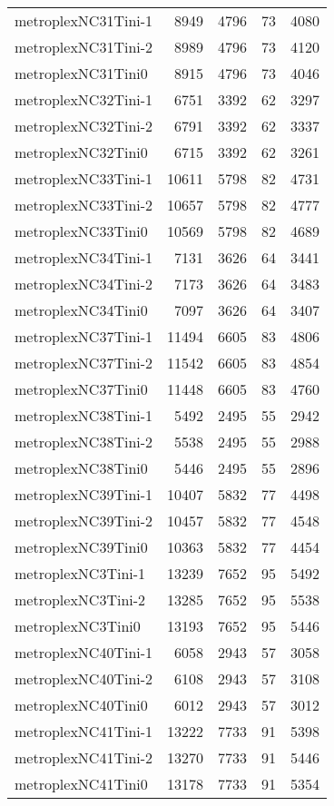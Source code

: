 \begin{longtable}{lrrrr}
metroplexNC31Tini-1 & 8949 & 4796 & 73 & 4080 \\
metroplexNC31Tini-2 & 8989 & 4796 & 73 & 4120 \\
metroplexNC31Tini0 & 8915 & 4796 & 73 & 4046 \\
metroplexNC32Tini-1 & 6751 & 3392 & 62 & 3297 \\
metroplexNC32Tini-2 & 6791 & 3392 & 62 & 3337 \\
metroplexNC32Tini0 & 6715 & 3392 & 62 & 3261 \\
metroplexNC33Tini-1 & 10611 & 5798 & 82 & 4731 \\
metroplexNC33Tini-2 & 10657 & 5798 & 82 & 4777 \\
metroplexNC33Tini0 & 10569 & 5798 & 82 & 4689 \\
metroplexNC34Tini-1 & 7131 & 3626 & 64 & 3441 \\
metroplexNC34Tini-2 & 7173 & 3626 & 64 & 3483 \\
metroplexNC34Tini0 & 7097 & 3626 & 64 & 3407 \\
metroplexNC37Tini-1 & 11494 & 6605 & 83 & 4806 \\
metroplexNC37Tini-2 & 11542 & 6605 & 83 & 4854 \\
metroplexNC37Tini0 & 11448 & 6605 & 83 & 4760 \\
metroplexNC38Tini-1 & 5492 & 2495 & 55 & 2942 \\
metroplexNC38Tini-2 & 5538 & 2495 & 55 & 2988 \\
metroplexNC38Tini0 & 5446 & 2495 & 55 & 2896 \\
metroplexNC39Tini-1 & 10407 & 5832 & 77 & 4498 \\
metroplexNC39Tini-2 & 10457 & 5832 & 77 & 4548 \\
metroplexNC39Tini0 & 10363 & 5832 & 77 & 4454 \\
metroplexNC3Tini-1 & 13239 & 7652 & 95 & 5492 \\
metroplexNC3Tini-2 & 13285 & 7652 & 95 & 5538 \\
metroplexNC3Tini0 & 13193 & 7652 & 95 & 5446 \\
metroplexNC40Tini-1 & 6058 & 2943 & 57 & 3058 \\
metroplexNC40Tini-2 & 6108 & 2943 & 57 & 3108 \\
metroplexNC40Tini0 & 6012 & 2943 & 57 & 3012 \\
metroplexNC41Tini-1 & 13222 & 7733 & 91 & 5398 \\
metroplexNC41Tini-2 & 13270 & 7733 & 91 & 5446 \\
metroplexNC41Tini0 & 13178 & 7733 & 91 & 5354 \\

\end{longtable}
